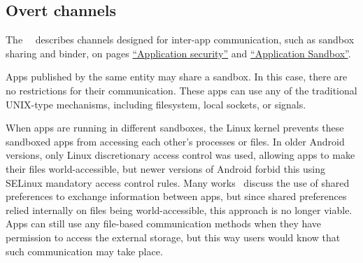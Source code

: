 \documentclass[article, oneside]{aaltoseries}
\begin{document}
\subsection{Overt channels}
\label{sec:overt}

The~\citeauthor{AOSPsecurity}~\cite{AOSPsecurity} describes channels designed for inter-app communication, such as sandbox sharing and binder, on pages \href{https://source.android.com/security/overview/app-security}{``Application security''} and \href{https://source.android.com/security/app-sandbox}{``Application Sandbox''}.

Apps published by the same entity may share a sandbox. In this case, there are no restrictions for their communication. These apps can use any of the traditional UNIX-type mechanisms, including filesystem, local sockets, or signals.

When apps are running in different sandboxes, the Linux kernel prevents these sandboxed apps from accessing each other's processes or files. In older Android versions, only Linux discretionary access control was used, allowing apps to make their files world-accessible, but newer versions of Android forbid this using SELinux mandatory access control rules. Many works~\cite{Bhandari2017, Asavoae2017} discuss the use of shared preferences to exchange information between apps, but since shared preferences relied internally on files being world-accessible, this approach is no longer viable. Apps can still use any file-based communication methods when they have permission to access the external storage, but this way users would know that such communication may take place.
\end{document}
